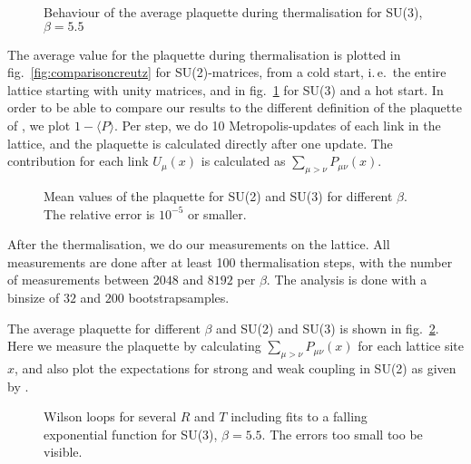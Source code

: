 \documentclass[%
 reprint,
 amsmath,amssymb,
 aps,
]{revtex4-1}
\begin{document}

\begin{figure}
	\centering
	
	\caption[Behaviour of the plaquette for SU(3)]{Behaviour of the average plaquette during thermalisation for SU(3), $\beta=5.5$}
	\label{fig:plaquettethermsu3}
\end{figure} 

The average value for the plaquette during thermalisation is plotted in fig.~\ref{fig:comparisoncreutz} for SU(2)-matrices, from a cold start, i.\,e.\, the entire lattice starting with unity matrices, and in fig.~\ref{fig:plaquettethermsu3} for SU(3) and a hot start. In order to be able to compare our results to the different definition of the plaquette of \citet{creutzsu2}, we plot $1-\langle P\rangle$. Per step, we do 10 Metropolis-updates of each link in the lattice, and the plaquette is calculated directly after one update. The contribution for each link $U_\mu(x)$ is calculated as $\sum_{\mu>\nu}P_{\mu\nu}(x)$.




\begin{figure}
	\centering
	
	\caption[Mean values of the plaquette]{Mean values of the plaquette for SU(2) and SU(3) for different $\beta$. The relative error is $10^{-5}$ or smaller.}
	\label{fig:plaquettetotal}
\end{figure}

After the thermalisation, we do our measurements on the lattice. All measurements are done after at least 100 thermalisation steps, with the number of measurements between $2048$ and $8192$ per $\beta$. The analysis is done with a binsize of $32$ and $200$ bootstrapsamples. 

The average plaquette for different $\beta$ and SU(2) and SU(3) is shown in fig.~\ref{fig:plaquettetotal}. Here we measure the plaquette by calculating $\sum_{\mu>\nu}P_{\mu\nu}(x)$ for each lattice site $x$, and also plot the expectations for strong and weak coupling in SU(2) as given by \citet{creutzsu2}.

\begin{figure}
	\centering
	
	\caption[Different Wilson loops for SU(3), $\beta=5.5$]{Wilson loops for several $R$ and $T$ including fits to a falling exponential function for SU(3), $\beta=5.5$. The errors too small too be visible.}
	\label{fig:wilsonloopbeta5.5su3}
\end{figure} 
\end{document}
